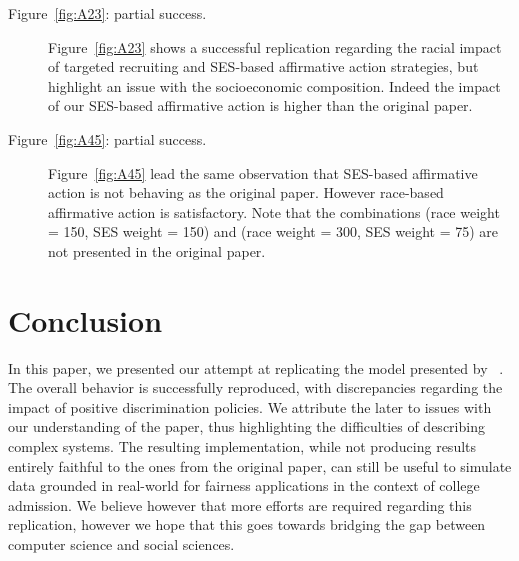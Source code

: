 \begin{description}
\item[Figure~\ref{fig:A23}: partial success.] Figure~\ref{fig:A23} shows a successful replication regarding the racial impact of targeted recruiting and SES-based affirmative action strategies, but highlight an issue with the socioeconomic composition. Indeed the impact of our SES-based affirmative action is higher than the original paper.

\item[Figure~\ref{fig:A45}: partial success.] Figure~\ref{fig:A45} lead the same observation that SES-based affirmative action is not behaving as the original paper. However race-based affirmative action is satisfactory. Note that the combinations (race weight = 150, SES weight = 150) and (race weight = 300, SES weight = 75) are not presented in the original paper.

\end{description}

\section{Conclusion}

In this paper, we presented our attempt at replicating the model presented by \citeauthor{reardon2018levels}~\cite{reardon2018levels}.
The overall behavior is successfully reproduced, with discrepancies regarding the impact of positive discrimination policies.
We attribute the later to issues with our understanding of the paper, thus highlighting the difficulties of describing complex systems.
The resulting implementation, while not producing results entirely faithful to the ones from the original paper, can still be useful to simulate data grounded in real-world for fairness applications in the context of college admission.
We believe however that more efforts are required regarding this replication, however we hope that this goes towards bridging the gap between computer science and social sciences.